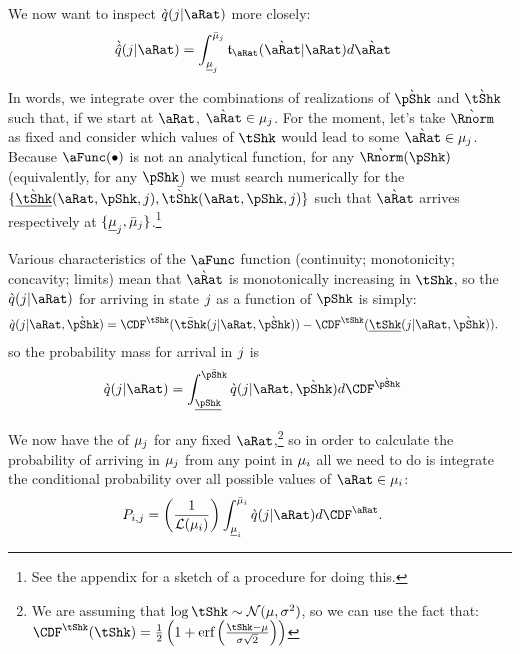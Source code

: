 \documentclass[../BufferStockTheory.tex]{subfiles}\usepackage{ApndxSteadyState}
\begin{document}
  We now want to inspect $\Nxt{\pDistDscr}(\that|\point)$ more closely:
  \begin{align}
    \Nxt{\pDistDscrAprx}(\that|\point) &=   \int_{\Bot{\SetSub}_{\that}}^{\Top{\SetSub}_{\that}}\trns_{\point}(\Nxt{\point}|\point) d\Nxt{\point}
  \end{align}

  In words, we integrate over the combinations of realizations of $\Nxt{\pShk}$ and $\Nxt{\tShk}$ such that, if we start at $\point$, $\Nxt{\point} \in \SetSub_{j}$.  For the moment, let's take $\Nxt{\Rnorm}$ as fixed and consider which values of $\tShk$ would lead to some $\Nxt{\point} \in \SetSub_{\that}$. Because $\aFunc(\bullet)$ is not an analytical function, for any $\Nxt{\Rnorm}(\pShk)$ (equivalently, for any $\pShk$) we must search numerically for the $\{\Bot{\Nxt{\tShk}}(\point,\pShk,\that),\Top{\Nxt{\tShk}}(\point,\pShk,\that)\}$ such that $\Nxt{\point}$ arrives respectively at $\{\Bot{\SetSub}_{\that},\Top{\SetSub}_{\that}\}$.\footnote{See the appendix for a sketch of a procedure for doing this.}


  Various characteristics of the $\aFunc$ function (continuity; monotonicity; concavity; limits) mean that $\Nxt{\point}$ is monotonically increasing in $\tShk$, so the {\pmf} $\Nxt{\pDistDscr}(\that|\point)$  for arriving in state $\that$ as a function of $\pShk$ is simply:
  \begin{align}
    \Nxt{\pDistDscr}(\that|\point,\Nxt{\pShk}) & = \CDF^{\tShk}(\Top{\tShk}(\that|\point,\Nxt{\pShk}))-\CDF^{\tShk}(\Bot{\tShk}(\that|\point,\Nxt{\pShk})).
  \end{align}
  so the probability mass for arrival in $\that$ is
  \begin{align}
    \Nxt{\pDistDscr}(\that | \point) & = \int_{\Bot{\pShk}}^{\Top{\pShk}} \Nxt{\pDistDscr}(\that|\point,\Nxt{\pShk}) d\CDF^{\Nxt{\pShk}}
  \end{align}

  We now have the {\pmf} of $\SetSub_{\that}$ for any fixed $\point$,\footnote{We are assuming that $\log \tShk \sim \mathcal{N}(\mu,\sigma^{2})$, so we can use the fact that:
    $\CDF^{\tShk}(\tShk) = \frac{1}{2}\left(1+\erf\left(\frac{\tShk-\mu}{\sigma \sqrt{2}}\right)\right)$
  } so in order to calculate the probability of arriving in $\SetSub_\that$ from any point in $\SetSub_\this$ all we need to do is integrate the conditional probability over all possible values of $\point \in \SetSub_{\this}$:
  \begin{align}
    \PTrns_{\this,\that} &=\left(\frac{1}{\Lebes(\SetSub_{\this})}\right) \int_{\Bot{\SetSub}_{\this}}^{\Top{\SetSub}_\this} \Nxt{\pDistDscr}(\that|\point) d\CDF^{\point}. \label{eq:PTrns}
  \end{align}
\end{document}
